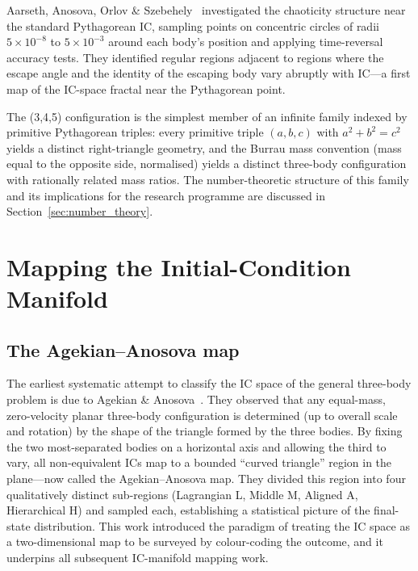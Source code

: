 \documentclass[11pt,a4paper]{article}
\begin{document}
Aarseth, Anosova, Orlov \& Szebehely~\cite{aarseth1994} investigated the chaoticity structure
near the standard Pythagorean IC, sampling points on concentric circles of radii $5 \times
10^{-8}$ to $5 \times 10^{-3}$ around each body's position and applying time-reversal accuracy
tests.  They identified regular regions adjacent to regions where the escape angle and the
identity of the escaping body vary abruptly with IC---a first map of the IC-space fractal near
the Pythagorean point.

The (3,4,5) configuration is the simplest member of an infinite family indexed by primitive
Pythagorean triples: every primitive triple $(a,b,c)$ with $a^2+b^2=c^2$ yields a distinct
right-triangle geometry, and the Burrau mass convention (mass equal to the opposite side,
normalised) yields a distinct three-body configuration with rationally related mass ratios.
The number-theoretic structure of this family and its implications for the research programme
are discussed in Section~\ref{sec:number_theory}.

\section{Mapping the Initial-Condition Manifold}

\subsection{The Agekian--Anosova map}

The earliest systematic attempt to classify the IC space of the general three-body problem is
due to Agekian \& Anosova~\cite{agekian1967}.  They observed that any equal-mass, zero-velocity
planar three-body configuration is determined (up to overall scale and rotation) by the shape of
the triangle formed by the three bodies.  By fixing the two most-separated bodies on a
horizontal axis and allowing the third to vary, all non-equivalent ICs map to a bounded
``curved triangle'' region in the plane---now called the Agekian--Anosova map.  They divided
this region into four qualitatively distinct sub-regions (Lagrangian L, Middle M, Aligned A,
Hierarchical H) and sampled each, establishing a statistical picture of the final-state
distribution.  This work introduced the paradigm of treating the IC space as a two-dimensional
map to be surveyed by colour-coding the outcome, and it underpins all subsequent
IC-manifold mapping work.
\end{document}
